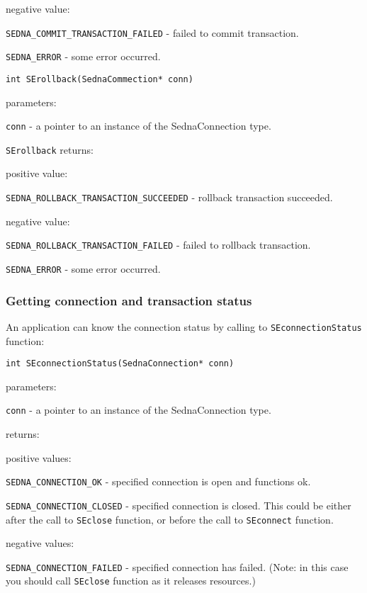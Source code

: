 \documentclass[a4paper,12pt]{article}
\begin{document}
negative value:

\verb!SEDNA_COMMIT_TRANSACTION_FAILED! - failed to commit transaction.

\verb!SEDNA_ERROR! - some error occurred.

\begin{verbatim}int SErollback(SednaCommection* conn)\end{verbatim}

parameters:

\verb!conn! - a pointer to an instance of the SednaConnection type.

\verb!SErollback! returns:

positive value:

\verb!SEDNA_ROLLBACK_TRANSACTION_SUCCEEDED! - rollback transaction succeeded.

negative value:

\verb!SEDNA_ROLLBACK_TRANSACTION_FAILED! - failed to rollback transaction.

\verb!SEDNA_ERROR! - some error occurred.




\subsubsection{Getting connection and transaction status}

An application can know the connection status by calling to \verb!SEconnectionStatus! function:

\begin{verbatim}int SEconnectionStatus(SednaConnection* conn)\end{verbatim}

parameters:

\verb!conn! - a pointer to an instance of the SednaConnection type.

returns:

positive values:

\verb!SEDNA_CONNECTION_OK! - specified connection is open and functions ok.

\verb!SEDNA_CONNECTION_CLOSED! - specified connection is closed. This could be either after the call to \verb!SEclose! function, or before the call to \verb!SEconnect! function.

negative values:

\verb!SEDNA_CONNECTION_FAILED! - specified connection has failed. (Note: in this case you should call \verb!SEclose! function as it releases resources.)
\end{document}
